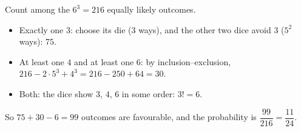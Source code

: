 Count among the $6^3=216$ equally likely outcomes.
\begin{itemize}
\item Exactly one $3$: choose its die ($3$ ways), and the other two dice avoid $3$ ($5^2$ ways): $75$.
\item At least one $4$ and at least one $6$: by inclusion--exclusion, $216-2\cdot5^3+4^3=216-250+64=30$.
\item Both: the dice show $3$, $4$, $6$ in some order: $3!=6$.
\end{itemize}
So $75+30-6=99$ outcomes are favourable, and the probability is $\dfrac{99}{216}=\boxed{\dfrac{11}{24}}$.
